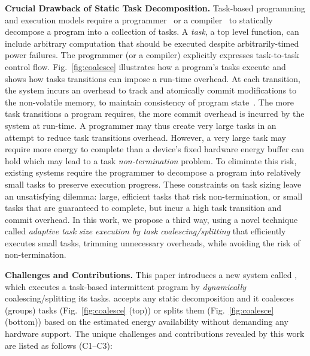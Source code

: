 \noindent\textbf{Crucial Drawback of Static Task Decomposition.} 
Task-based programming and execution models require a
programmer~\cite{alpaca,chain} or a compiler~\cite{baghsorkhi_cgo_2018} to
statically decompose a program into a collection of tasks.  A \emph{task}, a top level function, can
include arbitrary computation that should be executed despite arbitrarily-timed power failures.
The programmer (or a compiler) explicitly expresses task-to-task control flow.
Fig.~\ref{fig:coalesce} illustrates how a program's tasks execute and
shows how tasks transitions can impose a run-time overhead. At each transition, the system incurs an overhead to track and atomically commit modifications to the non-volatile memory, to maintain consistency of program state~\cite{chain,alpaca}. The more task transitions a program requires, the more commit overhead is incurred by the system at run-time.
%
A programmer may thus create very large tasks in an attempt to reduce task transitions
overhead. However, a very large task may require more energy to complete than a device's fixed hardware energy
buffer can hold which may lead to a task \emph{non-termination} problem. To eliminate this risk,
existing systems require the programmer to decompose a program into relatively small tasks to preserve execution progress. These constraints on task sizing leave an unsatisfying dilemma: large, efficient tasks that risk non-termination, or small tasks that are guaranteed to complete, but incur a high task transition and commit overhead. In this work,
we propose a third way, using a novel technique called \emph{adaptive task size execution by task coalescing/splitting} that efficiently executes small tasks, trimming unnecessary overheads, while avoiding the risk of non-termination.
%

\noindent\textbf{Challenges and Contributions.}
This paper introduces a new system called \emph{\sys}, which executes a task-based
intermittent program by \emph{dynamically} coalescing/splitting its tasks.
\sys accepts any static decomposition and it coalesces (groups) tasks (Fig.~\ref{fig:coalesce} (top)) or splits them (Fig.~\ref{fig:coalesce} (bottom)) based on the estimated energy availability without demanding any hardware support. The unique challenges and contributions revealed by this work are listed as follows (C1--C3): 


